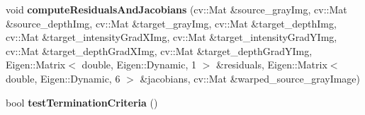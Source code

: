 \begin{DoxyCompactItemize}
\item 
\hypertarget{class_photoconsistency_odometry_1_1_bi_objective_1_1_c_photoconsistency_odometry_bi_objective_a94c422985f1b377017ffb4cf81ccb33c}{
void {\bfseries computeResidualsAndJacobians} (cv::Mat \&source\_\-grayImg, cv::Mat \&source\_\-depthImg, cv::Mat \&target\_\-grayImg, cv::Mat \&target\_\-depthImg, cv::Mat \&target\_\-intensityGradXImg, cv::Mat \&target\_\-intensityGradYImg, cv::Mat \&target\_\-depthGradXImg, cv::Mat \&target\_\-depthGradYImg, Eigen::Matrix$<$ double, Eigen::Dynamic, 1 $>$ \&residuals, Eigen::Matrix$<$ double, Eigen::Dynamic, 6 $>$ \&jacobians, cv::Mat \&warped\_\-source\_\-grayImage)}
\label{class_photoconsistency_odometry_1_1_bi_objective_1_1_c_photoconsistency_odometry_bi_objective_a94c422985f1b377017ffb4cf81ccb33c}

\item 
\hypertarget{class_photoconsistency_odometry_1_1_bi_objective_1_1_c_photoconsistency_odometry_bi_objective_aa9be21372875ed2d640d473c39315877}{
bool {\bfseries testTerminationCriteria} ()}
\label{class_photoconsistency_odometry_1_1_bi_objective_1_1_c_photoconsistency_odometry_bi_objective_aa9be21372875ed2d640d473c39315877}

\end{DoxyCompactItemize}
